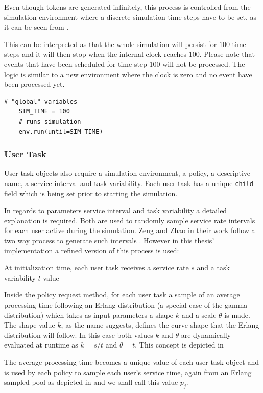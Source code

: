 \documentclass{seal_thesis}
\begin{document}
Even though tokens are generated infinitely, this process is controlled from the simulation environment where a discrete simulation time steps have to be set, as it can be seen from .

This can be interpreted as that the whole simulation will persist for $100$ time steps and it will then stop when the internal clock reaches $100$. Please note that events that have been scheduled for time step $100$ will not be processed. The logic is similar to a new environment where the clock is zero and no event have been processed yet.

\begin{lstlisting}[caption=Starting the simulation with discrete time steps,label=lst:simulation_steps,style=CustomPython]
    # "global" variables
    SIM_TIME = 100
    # runs simulation
    env.run(until=SIM_TIME)
\end{lstlisting}

\subsubsection{User Task}
\label{subsec:user_task}

User task objects also require a simulation environment, a policy, a descriptive name, a service interval and task variability. Each user task has a unique \texttt{child} field which is being set prior to starting the simulation.

In regards to parameters service interval and task variability a detailed explanation is required. Both are used to randomly sample service rate intervals for each user active during the simulation. Zeng and Zhao in their work follow a two way process to generate such intervals \cite[p. 8]{Zeng2005}. However in this thesis' implementation a refined version of this process is used:
\begin{enumerate*}
	\item At initialization time, each user task receives a service rate $s$ and a task variability $t$ value
	\item Inside the policy request method, for each user task a sample of an average processing time following an Erlang distribution (a special case of the gamma distribution) which takes as input parameters a shape $k$ and a scale $\theta$ is made. The shape value $k$, as the name suggests, defines the curve shape that the Erlang distribution will follow. In this case both values $k$ and $\theta$ are dynamically evaluated at runtime as $k=s/t$ and $\theta = t$. This concept is depicted in 
	\item The average processing time becomes a unique value of each user task object and is used by each policy to sample each user's service time, again from an Erlang sampled pool as depicted in  and we shall call this value $p_j$.
\end{enumerate*}
\end{document}
